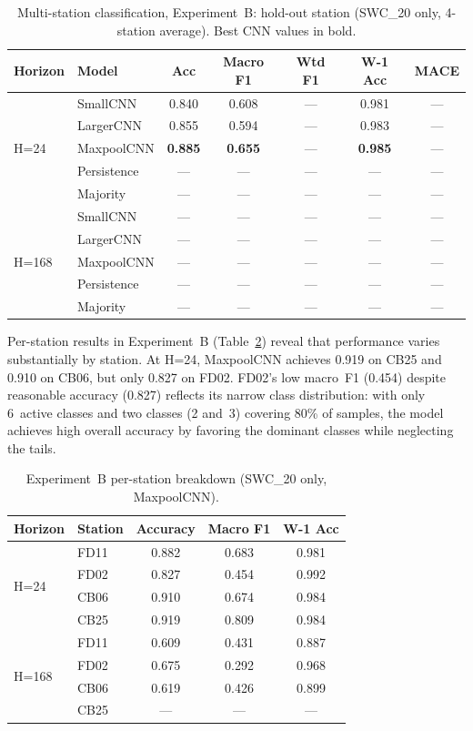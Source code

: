 \documentclass[11pt]{article}
\begin{document}
\begin{table}[h]
\centering
\caption{Multi-station classification, Experiment~B: hold-out station
(SWC\_20 only, 4-station average). Best CNN values in bold.}
\label{tab:multi_cls_b}
\small
\begin{tabular}{llccccc}
\toprule
Horizon & Model & Acc & Macro F1 & Wtd F1 & W-1 Acc & MACE \\
\midrule
\multirow{5}{*}{H=24}
 & SmallCNN     & 0.840 & 0.608 & --- & 0.981 & --- \\
 & LargerCNN    & 0.855 & 0.594 & --- & 0.983 & --- \\
 & MaxpoolCNN   & \textbf{0.885} & \textbf{0.655} & --- & \textbf{0.985} & --- \\
 & Persistence  & --- & --- & --- & --- & --- \\
 & Majority     & --- & --- & --- & --- & --- \\
\midrule
\multirow{5}{*}{H=168}
 & SmallCNN     & --- & --- & --- & --- & --- \\
 & LargerCNN    & --- & --- & --- & --- & --- \\
 & MaxpoolCNN   & --- & --- & --- & --- & --- \\
 & Persistence  & --- & --- & --- & --- & --- \\
 & Majority     & --- & --- & --- & --- & --- \\
\bottomrule
\end{tabular}
\end{table}

Per-station results in Experiment~B (Table~\ref{tab:multi_cls_b_station}) reveal
that performance varies substantially by station. At H=24, MaxpoolCNN achieves
0.919 on CB25 and 0.910 on CB06, but only 0.827 on FD02. FD02's low macro~F1
(0.454) despite reasonable accuracy (0.827) reflects its narrow class distribution:
with only 6~active classes and two classes (2 and~3) covering 80\% of samples, the
model achieves high overall accuracy by favoring the dominant classes while
neglecting the tails.

\begin{table}[h]
\centering
\caption{Experiment~B per-station breakdown (SWC\_20 only, MaxpoolCNN).}
\label{tab:multi_cls_b_station}
\small
\begin{tabular}{llccc}
\toprule
Horizon & Station & Accuracy & Macro F1 & W-1 Acc \\
\midrule
\multirow{4}{*}{H=24}
 & FD11 & 0.882 & 0.683 & 0.981 \\
 & FD02 & 0.827 & 0.454 & 0.992 \\
 & CB06 & 0.910 & 0.674 & 0.984 \\
 & CB25 & 0.919 & 0.809 & 0.984 \\
\midrule
\multirow{4}{*}{H=168}
 & FD11 & 0.609 & 0.431 & 0.887 \\
 & FD02 & 0.675 & 0.292 & 0.968 \\
 & CB06 & 0.619 & 0.426 & 0.899 \\
 & CB25 & --- & --- & --- \\
\bottomrule
\end{tabular}
\end{table}
\end{document}
